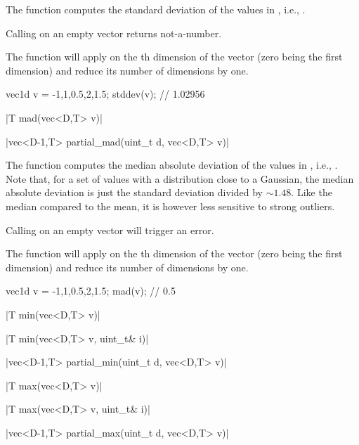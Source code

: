 The function  computes the standard deviation of the values in , i.e., .

Calling  on an empty vector returns not-a-number.

The function  will apply  on the th dimension of the vector (zero being the first dimension) and reduce its number of dimensions by one.

\begin{example}
\begin{cppcode}
vec1d v = {-1,1,0.5,2,1.5};
stddev(v); // 1.02956
\end{cppcode}
\end{example}

\funcitem \cppinline|T mad(vec<D,T> v)| 

\cppinline|vec<D-1,T> partial_mad(uint_t d, vec<D,T> v)| 

The function  computes the median absolute deviation of the values in , i.e., . Note that, for a set of values with a distribution close to a Gaussian, the median absolute deviation is just the standard deviation divided by $\sim1.48$. Like the median compared to the mean, it is however less sensitive to strong outliers.

Calling  on an empty vector will trigger an error.

The function  will apply  on the th dimension of the vector (zero being the first dimension) and reduce its number of dimensions by one.

\begin{example}
\begin{cppcode}
vec1d v = {-1,1,0.5,2,1.5};
mad(v); // 0.5
\end{cppcode}
\end{example}

\funcitem \cppinline|T min(vec<D,T> v)| 

\cppinline|T min(vec<D,T> v, uint_t& i)|

\cppinline|vec<D-1,T> partial_min(uint_t d, vec<D,T> v)| 

\cppinline|T max(vec<D,T> v)| 

\cppinline|T max(vec<D,T> v, uint_t& i)|

\cppinline|vec<D-1,T> partial_max(uint_t d, vec<D,T> v)| 

